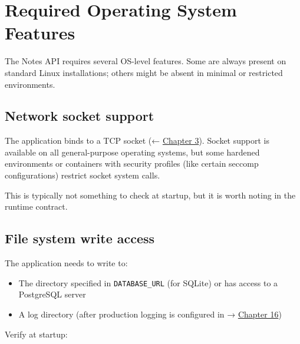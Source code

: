 \setcounter{section}{1}
\section{Required Operating System Features}\label{14-runtime-contract:142-required-operating-system-features}

The Notes API requires several OS-level features. Some are always present on standard Linux installations; others might be absent in minimal or restricted environments.

\subsection*{Network socket support}\label{14-runtime-contract:network-socket-support}

The application binds to a TCP socket (← \hyperref[ch:03-network-capability]{Chapter 3}). Socket support is available on all general-purpose operating systems, but some hardened environments or containers with security profiles (like certain seccomp configurations) restrict socket system calls.

This is typically not something to check at startup, but it is worth noting in the runtime contract.

\subsection*{File system write access}\label{14-runtime-contract:file-system-write-access}

The application needs to write to:

\begin{itemize}
\tightlist
\item
  The directory specified in \texttt{DATABASE\_URL} (for SQLite) or has access to a PostgreSQL server
\item
  A log directory (after production logging is configured in → \hyperref[ch:16-logging-error-handling]{Chapter 16})
\end{itemize}

\noindent{}Verify at startup:

